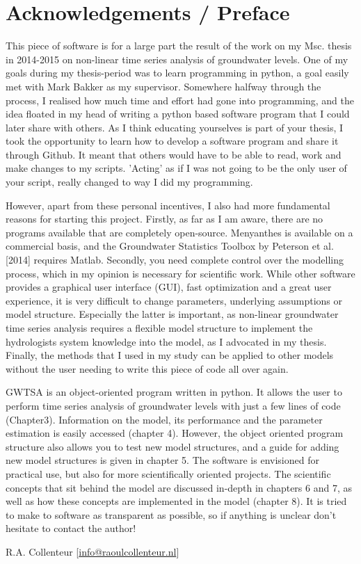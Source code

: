 \section{Acknowledgements / Preface}
This piece of software is for a large part the result of the work on my Msc. thesis in 2014-2015 on non-linear time series analysis of groundwater levels. One of my goals during my thesis-period was to learn programming in python, a goal easily met with Mark Bakker as my supervisor. Somewhere halfway through the process, I realised how much time and effort had gone into programming, and the idea floated in my head of writing a python based software program that I could later share with others. As I think educating yourselves is part of your thesis, I took the opportunity to learn how to develop a software program and share it through Github. It meant that others would have to be able to read, work and make changes to my scripts. 'Acting' as if I was not going to be the only user of your script, really changed to way I did my programming.

However, apart from these personal incentives, I also had more fundamental reasons for starting this project. Firstly, as far as I am aware, there are no programs available that are completely open-source. Menyanthes is available on a commercial basis, and the Groundwater Statistics Toolbox by Peterson et al. [2014] requires Matlab. Secondly, you need complete control over the modelling process, which in my opinion is necessary for scientific work. While other software provides a graphical user interface (GUI), fast optimization and a great user experience, it is very difficult to change parameters, underlying assumptions or model structure. Especially the latter is important, as non-linear groundwater time series analysis requires a flexible model structure to implement the hydrologists system knowledge into the model, as I advocated in my thesis. Finally, the methods that I used in my study can be applied to other models without the user needing to write this piece of code all over again. 

GWTSA is an object-oriented program written in python. It allows the user to perform time series analysis of groundwater levels with just a few lines of code (Chapter3). Information on the model, its performance and the parameter estimation is easily accessed (chapter 4). However, the object oriented program structure also allows you to test new model structures, and a guide for adding new model structures is given in chapter 5. The software is envisioned for practical use, but also for more scientifically oriented projects. The scientific concepts that sit behind the model are discussed in-depth in chapters 6 and 7, as well as how these concepts are implemented in the model (chapter 8). It is tried to make to software as transparent as possible, so if anything is unclear don't hesitate to contact the author!

R.A. Collenteur [\url{info@raoulcollenteur.nl}]



 
